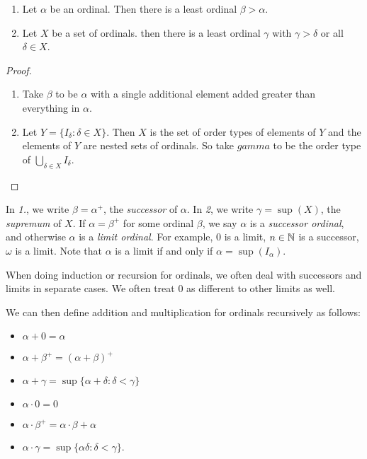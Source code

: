 \documentclass[10pt,a4paper]{article}
\begin{document}
\begin{proposition}
\item
\begin{enumerate}
\item Let $\alpha$ be an ordinal. Then there is a least ordinal $\beta > \alpha$.
\item Let $X$ be a set of ordinals. then there is a least ordinal $\gamma$ with $\gamma >\delta$ or all $\delta \in X$.
\end{enumerate}
\end{proposition}
\begin{proof}
\item
\begin{enumerate}
\item Take $\beta$ to be $\alpha$ with a single additional element added greater than everything in $\alpha$.
\item Let $Y = \{I_{\delta} : \delta \in X\}$. Then $X$ is the set of order types of elements of $Y$ and the elements of $Y$ are nested sets of ordinals. So take $gamma$ to be the order type of $\bigcup_{\delta \in X} I_{\delta}$.
\end{enumerate}
\end{proof}

In \textit{1.}, we write $\beta = \alpha^{+}$, the \emph{successor} of $\alpha$. In \textit{2}, we write $\gamma = \sup(X)$, the \emph{supremum} of $X$. If $\alpha = \beta^{+}$ for some ordinal $\beta$, we say $\alpha$ is a \emph{successor ordinal}, and otherwise $\alpha$ is a \emph{limit ordinal}. For example, $0$ is a limit, $n \in \mathbb{N}$ is a successor, $\omega$ is a limit. Note that $\alpha$ is a limit if and only if $\alpha = \sup(I_{\alpha})$.

When doing induction or recursion for ordinals, we often deal with successors and limits in separate cases. We often treat $0$ as different to other limits as well.

We can then define addition and multiplication for ordinals recursively as follows:
\begin{itemize}
\item $\alpha + 0 = \alpha$
\item $\alpha + \beta^{+} = (\alpha + \beta)^{+}$
\item $\alpha + \gamma = \sup\{\alpha + \delta : \delta < \gamma\}$
\item $\alpha \cdot 0 = 0$
\item $\alpha \cdot \beta^{+} = \alpha \cdot \beta + \alpha$
\item $\alpha \cdot \gamma = \sup\{\alpha\delta : \delta < \gamma\}$.
\end{itemize}
\end{document}

